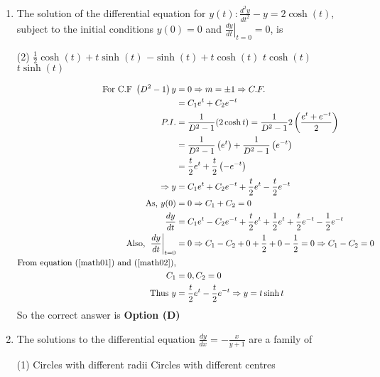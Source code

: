 \begin{enumerate}[label=\color{ocre}\textbf{\arabic*.}]
	\item  The solution of the differential equation for $y(t): \frac{d^{2} y}{d t^{2}}-y=2 \cosh (t)$, subject to the initial conditions $y(0)=0$ and $\left.\frac{d y}{d t}\right|_{t=0}=0$, is
	{}
	\begin{tasks}(2)
		\task[\textbf{A.}] $\frac{1}{2} \cosh (t)+t \sinh (t)$
		\task[\textbf{B.}] $-\sinh (t)+t \cosh (t)$
		\task[\textbf{C.}] $t \cosh (t)$
		\task[\textbf{D.}] $t \sinh (t)$
	\end{tasks}
	\begin{answer}
		\begin{align}
		\text{	For C.F } \left(D^{2}-1\right) y&=0 \Rightarrow m=\pm 1 \Rightarrow C . F .\notag\\&=C_{1} e^{t}+C_{2} e^{-t}\notag\\
		P.I. &=\frac{1}{D^{2}-1}(2 \cosh t)=\frac{1}{D^{2}-1} 2\left(\frac{e^{t}+e^{-t}}{2}\right)\notag\\&=\frac{1}{D^{2}-1}\left(e^{t}\right)+\frac{1}{D^{2}-1}\left(e^{-t}\right)\notag\\&=\frac{t}{2} e^{t}+\frac{t}{2}\left(-e^{-t}\right)\notag\\
		\Rightarrow y&=C_{1} e^{t}+C_{2} e^{-t}+\frac{t}{2} e^{t}-\frac{t}{2} e^{-t}\notag\\
		\text{As, }y(0)&=0 \Rightarrow C_{1}+C_{2}=0\label{math01}\\
		\frac{d y}{d t}&=C_{1} e^{t}-C_{2} e^{-t}+\frac{t}{2} e^{t}+\frac{1}{2} e^{t}+\frac{t}{2} e^{-t}-\frac{1}{2} e^{-t}\notag\\
		\text{Also, }\left.\frac{d y}{d t}\right|_{t=0}&=0 \Rightarrow C_{1}-C_{2}+0+\frac{1}{2}+0-\frac{1}{2}=0 \Rightarrow C_{1}-C_{2}=0\label{math02}\\
		\text{From equation (\ref{math01}) and (\ref{math02}),}\notag\\
		C_{1}&=0, C_{2}=0\notag\\
		\text{Thus }y&=\frac{t}{2} e^{t}-\frac{t}{2} e^{-t} \Rightarrow y=t \sinh t\notag
		\end{align}
		So the correct answer is \textbf{Option (D)}
	\end{answer}
	\item The solutions to the differential equation $\frac{d y}{d x}=-\frac{x}{y+1}$ are a family of
	{}
	\begin{tasks}(1)
		\task[\textbf{A.}] Circles with different radii
		\task[\textbf{B.}] Circles with different centres

\end{tasks}
\end{enumerate}
